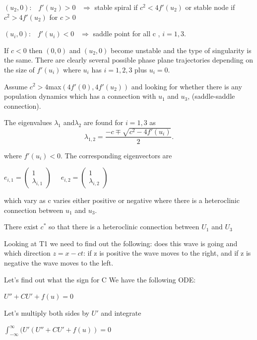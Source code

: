 \documentclass[]{article}
\numberwithin{equation}{section}		%
\begin{document}
$(u_2,0):$ \ $ f'(u_2)> 0 $ \ $ \Rightarrow$ stable spiral if $c^2<4 f'(u_2)$ or stable node if $c^2> 4f'(u_2)$ for $c>0$

$(u_i,0):$ \ $ f'(u_i)< 0 $ \ $ \Rightarrow$ saddle point for all c , $i=1,3$.

If $c < 0$ then $(0, 0)$ and $(u_2, 0)$ become unstable and the type of singularity is the same.
There are clearly several possible phase plane trajectories depending on the size of $f'(u_i )$ where $u_i$ has $i = 1, 2, 3$ plus $u_i = 0.$

Assume $c^2 > 4 $max$ (4f'(0),4f'(u_2))$ and looking for whether there is any population dynamics which has a connection with $u_1$ and $u_3$, (saddle-saddle connection).

The eigenvalues $\lambda_1$ and$\lambda_2$ are found for $i=1,3$ as
\begin{equation}
\lambda_{1,2} = \frac{-c \mp \sqrt{c^2-4f'(u_i)} }{2}.
\end{equation}

where $f'(u_i)<0$. The corresponding eigenvectors are
\begin{center}
$e_{i,1}= \begin{pmatrix} 1 \\ \lambda_{i,1} \end{pmatrix} $ \ \ $e_{i,2}= \begin{pmatrix} 1 \\ \lambda_{i,2} \end{pmatrix} $
\end{center}

which vary as c varies either positive or negative where there is a heteroclinic connection between $u_1$ and $u_3$.

There exist $c^*$ so that there is a heteroclinic connection between $U_1$ and $U_3$

Looking at T1 we need to find out the following: does this wave is going and which direction $z = x - ct$: if z is positive the wave moves to the right, and if z is negative the wave moves to the left.

Let's find out what the sign for C
We have the following ODE:

\begin{center}
$U'' + CU' + f(u) = 0$
\end{center}

Let's multiply both sides by $U'$ and integrate

\begin{center}
$\int _{-\infty}^{\infty} (U' (U''+CU'+f (u ) )=0$
\end{center}
\end{document}

